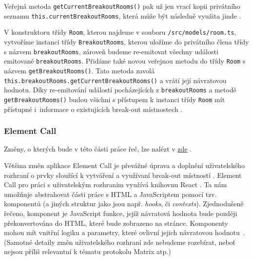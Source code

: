 Veřejná metoda \texttt{getCurrentBreakoutRooms()} pak už jen
vrací kopii privátního seznamu
\texttt{this.currentBreakoutRooms}, která může být následně
využita jinde \cite{GitHub-MatrixJSSDK-BreakoutRooms}.

V konstruktoru třídy \texttt{Room}, kterou najdeme v souboru
\texttt{/src/models/room.ts}, vytvoříme instanci třídy
\texttt{BreakoutRooms}, kterou uložíme do privátního člena třídy
s názvem \texttt{breakoutRooms}, zároveň budeme re-emitovat
všechny události emitované \texttt{breakoutRooms}. Přidáme také
novou veřejnou metodu do třídy \texttt{Room} s názvem
\texttt{getBreakoutRooms()}. Tato metoda zavolá
\texttt{this.breakoutRooms.getCurrentBreakoutRooms()} a vrátí
její návratovou hodnotu. Díky re-emitování událostí pocházejících z
\texttt{breakoutRooms} a metodě
\texttt{getBreakoutRooms()} budou všichni s přístupem k instanci
třídy \texttt{Room} mít přístupné i~informace o existujících
break-out místnostech \cite{GitHub-MatrixJSSDK-BreakoutRooms}.

\subsubsection{Element Call}

Změny, o kterých bude v této části práce řeč, lze nalézt v
\href{https://github.com/vector-im/element-call/pull/1615/}{zde}
\cite{GitHub-ElementCall-BreakoutRooms}.

Většina změn aplikace Element Call je převážné úprava a doplnění uživatelského
rozhraní o prvky sloužící k vytváření a využívaní break-out místností
\cite{GitHub-ElementCall-BreakoutRooms}. Element Call pro práci s uživatelským
rozhraním využívá knihovnu React \cite{GitHub-ElementCall}. Ta nám umožňuje
abstrahovat části práce s HTML a JavaScriptem pomocí tzv. komponentů (a jiných
struktur jako jsou např. \textit{hooks}, či \textit{contexts}). Zjednodušeně
řečeno, komponent je JavaScript funkce, jejíž návratová hodnota bude později
překonvertována do HTML, které bude zobrazeno na stránce. Komponenty mohou mít
vnitřní logiku a parametry, které ovlivní jejich návratovou
hodnotu~\cite{React-Homepage}. (Samotné detaily změn uživatelského rozhraní zde
nebudeme rozebírat, neboť nejsou příliš relevantní k tématu protokolu Matrix
atp.)

